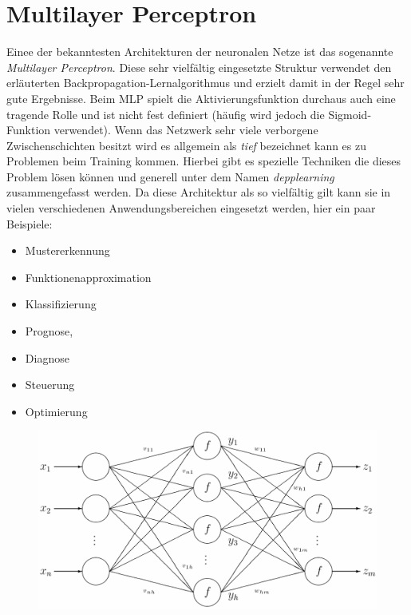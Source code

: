 \section{Multilayer Perceptron}

Einee der bekanntesten Architekturen der neuronalen Netze ist das sogenannte \emph{Multilayer Perceptron}. Diese sehr vielfältig eingesetzte Struktur verwendet den erläuterten Backpropagation-Lernalgorithmus und erzielt damit in der Regel sehr gute Ergebnisse. Beim MLP spielt die Aktivierungsfunktion durchaus auch eine tragende Rolle und ist nicht fest definiert (häufig wird jedoch die Sigmoid-Funktion verwendet). Wenn das Netzwerk sehr viele verborgene Zwischenschichten besitzt wird es allgemein als \emph{tief} bezeichnet kann es zu Problemen beim Training kommen. Hierbei gibt es spezielle Techniken die dieses Problem lösen können und generell unter dem Namen \emph{depplearning} zusammengefasst werden. Da diese Architektur als so vielfältig gilt kann sie in vielen verschiedenen Anwendungsbereichen eingesetzt werden, hier ein paar Beispiele: 

\begin{multicols}{2}
\begin{itemize}
\item Mustererkennung 
\item Funktionenapproximation
\item Klassifizierung
\item Prognose,
\item Diagnose
\item Steuerung 
\item Optimierung
\end{itemize}
\end{multicols}

\begin{figure}[!htb]
	\centering
	\includegraphics[width=.8\linewidth]{./img/mlp1}
	\label{fig:erstesPerceptron}
\end{figure}